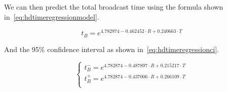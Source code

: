 We can then predict the total broadcast time using the formula shown
in~\eqref{eq:hdtimeregressionmodel}.

\begin{equation}\label{eq:hdtimeregressionmodel}
	t_B = e^{4.782874 - 0.462452 \cdot R + 0.240663 \cdot T}
\end{equation}

And the 95\% confidence interval as shown in~\eqref{eq:hdtimeregressionci}.

\begin{equation}\label{eq:hdtimeregressionci}
	\begin{cases}
		t^-_B = e^{4.782874 - 0.487897 \cdot R + 0.215217 \cdot T}\\
		t^+_B = e^{4.782874 - 0.437006 \cdot R + 0.266109 \cdot T}\\
	\end{cases}
\end{equation}
